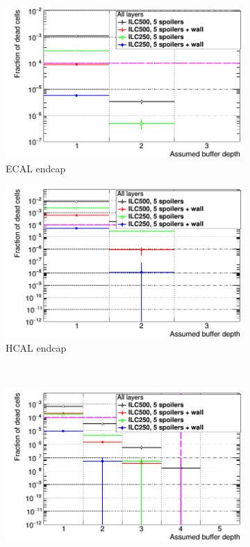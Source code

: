   \begin{figure}[htb]\ContinuedFloat
   \begin{subfigure}[b]{0.49\textwidth}
   \centering
    \includegraphics[width=\textwidth]{Figures/BDS_muons/Occupancy_Comparison_All_layers_deadcells_EcalEndcap.png}
   \caption{\sid ECAL endcap}
   \end{subfigure}
   \hfill
    \begin{subfigure}[b]{0.49\textwidth}
   \centering
    \includegraphics[width=\textwidth]{Figures/BDS_muons/Occupancy_Comparison_All_layers_deadcells_HcalEndcap.png}
   \caption{\sid HCAL endcap}
   \end{subfigure}\\
   \begin{subfigure}[b]{0.49\textwidth}
   \centering
    \includegraphics[width=\textwidth]{Figures/BDS_muons/Occupancy_Comparison_All_layers_deadcells_MuonBarrel.png}

\end{subfigure}
\end{figure}
